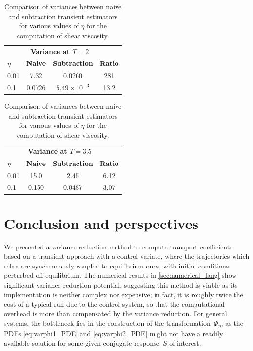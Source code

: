 \documentclass[11pt]{article}
\newcommand\sn[2]{{#1}\times 10^{#2}}
\theoremstyle{definition}
\begin{document}
\begin{table}[h!]
\begin{subtable}[h]{0.45\textwidth}
\centering
\begin{tabular}{@{}lccc@{}}
\toprule
 & \multicolumn{2}{c}{\textbf{Variance at $T=2$}} &  \\
\cmidrule(lr){2-3}
$\eta$ & \textbf{Naive } & \textbf{Subtraction } & \textbf{Ratio} \\
\midrule
0.01 & 7.32 & 0.0260 & 281 \\
0.1 & 0.0726 & $\sn{5.49}{-3}$ & 13.2 \\
\bottomrule
\end{tabular}
\caption{Data at $T=2$ (start of decoupling)}
\end{subtable}\hfill
\begin{subtable}[h]{0.45\textwidth}
\centering
\begin{tabular}{@{}lccc@{}}
\toprule
 & \multicolumn{2}{c}{\textbf{Variance at $T=3.5$}} &  \\
\cmidrule(lr){2-3}
 $\eta$ & \textbf{Naive } & \textbf{Subtraction } & \textbf{Ratio} \\
\midrule
0.01 & 15.0 & 2.45 & 6.12 \\
0.1  & 0.150  & 0.0487 & 3.07 \\
\bottomrule
\end{tabular}
\caption{Data at $T=3.5$ (total decoupling)}
\end{subtable}
\caption{Comparison of variances between naive and subtraction transient estimators for various values of $\eta$ for the computation of shear viscosity.}
\label{table:LJ_shear}
\end{table}

\section{Conclusion and perspectives}
\label{sec:conclusion}

We presented a variance reduction method to compute transport coefficients based on a transient approach with a control variate, where the trajectories which relax are synchronously coupled to equilibrium ones, with initial conditions perturbed off equilibrium. The numerical results in \cref{sec:numerical_lang} show significant variance-reduction potential, suggesting this method is viable as its implementation is neither complex nor expensive; in fact, it is roughly twice the cost of a typical run due to the control system, so that the computational overhead is more than compensated by the variance reduction. For general systems, the bottleneck lies in the construction of the transformation~$\Phi_\eta$, as the PDEs \eqref{eq:varphi1_PDE} and \eqref{eq:varphi2_PDE} might not have a readily available solution for some given conjugate response~$S$ of interest. 
\end{document}
